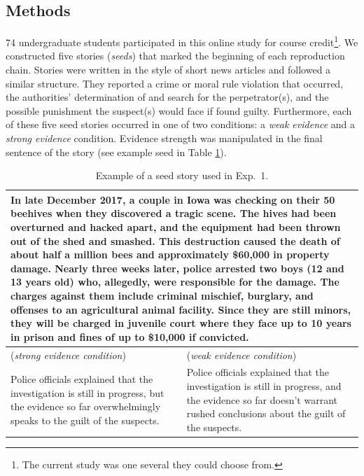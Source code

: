 \documentclass[10pt,letterpaper]{article}
\begin{document}
\subsection{Methods}
74 undergraduate students participated in this online study for course credit\footnote{The current study was one several they could choose from.}. 
We constructed five stories (\textit{seeds}) that marked the beginning of each reproduction chain.  Stories were written in the style of short news articles and followed a similar structure. They reported a crime or moral rule violation that occurred, the authorities' determination of and search for the perpetrator(s), and the possible punishment the suspect(s) would face if found guilty. Furthermore, each of these five seed stories occurred in one of two conditions: a \emph{weak evidence} and a \emph{strong evidence} condition. Evidence strength was manipulated in the final sentence of the story (see example seed in Table \ref{tab:examplestory}).

\begin{table}
\caption{Example of a seed story used in Exp.~1.}
\centering
\begin{tabular}{p{} p{}}
  \toprule
  \multicolumn{2}{p{0.925\textwidth}}{In late December 2017, a couple in Iowa was checking on their 50 beehives when they discovered a tragic scene. The hives had been overturned and hacked apart, and the equipment had been thrown out of the shed and smashed. This destruction caused the death of about half a million bees and approximately \$60,000 in property damage. Nearly three weeks later, police arrested two boys (12 and 13 years old) who, allegedly, were responsible for the damage. The charges against them include criminal mischief, burglary, and offenses to an agricultural animal facility. Since they are still minors, they will be charged in juvenile court where they face up to 10 years in prison and fines of up to \$10,000 if convicted.}\\ 
  \midrule
  (\emph{strong evidence condition}) & (\emph{weak evidence condition})  \\
  Police officials explained that the investigation is still in progress, but the evidence so far overwhelmingly speaks to the guilt of the suspects.  & Police officials explained that the investigation is still in progress, and the evidence so far doesn't warrant rushed conclusions about the guilt of the suspects. \\ 
  \bottomrule
\end{tabular}
\label{tab:examplestory}
\end{table}
\end{document}
